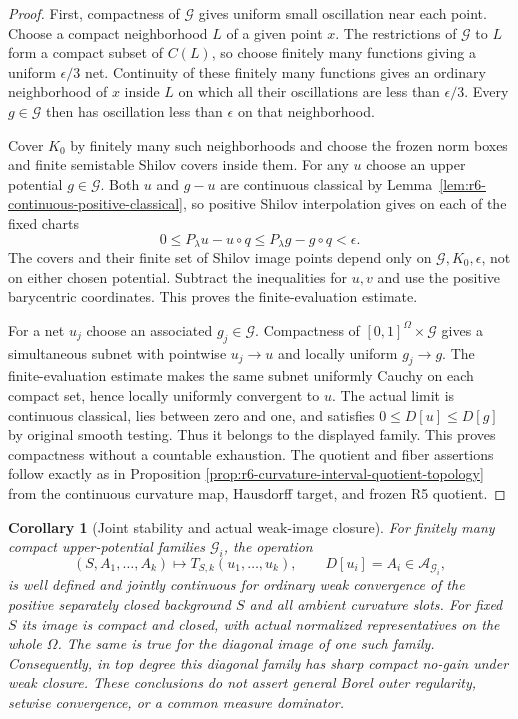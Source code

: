 \documentclass[11pt,a4paper]{article}
\numberwithin{equation}{section}
\newtheorem{corollary}[theorem]{Corollary}
\theoremstyle{definition}
\theoremstyle{remark}
\begin{document}
\begin{proof}
First, compactness of $\mathscr G$ gives uniform small oscillation
near each point. Choose a compact neighborhood $L$ of a given point
$x$. The restrictions of $\mathscr G$ to $L$ form a compact subset
of $C(L)$, so choose finitely many functions giving a uniform
$\epsilon/3$ net. Continuity of these finitely many functions gives
an ordinary neighborhood of $x$ inside $L$ on which all their
oscillations are less than $\epsilon/3$. Every $g\in\mathscr G$
then has oscillation less than $\epsilon$ on that neighborhood.

Cover $K_0$ by finitely many such neighborhoods and choose the
frozen norm boxes and finite semistable Shilov covers inside them.
For any $u$ choose an upper potential $g\in\mathscr G$. Both
$u$ and $g-u$ are continuous classical by
Lemma~\ref{lem:r6-continuous-positive-classical}, so positive
Shilov interpolation gives on each of the fixed charts
\[
                   0\le P_\lambda u-u\circ q
                         \le P_\lambda g-g\circ q<\epsilon.
\]
The covers and their finite set of Shilov image points depend only
on $\mathscr G,K_0,\epsilon$, not on either chosen potential.
Subtract the inequalities for $u,v$ and use the positive barycentric
coordinates. This proves the finite-evaluation estimate.

For a net $u_j$ choose an associated $g_j\in\mathscr G$. Compactness
of $[0,1]^\Omega\times\mathscr G$ gives a simultaneous subnet
with pointwise $u_j\to u$ and locally uniform $g_j\to g$.
The finite-evaluation estimate makes the same subnet uniformly Cauchy
on each compact set, hence locally uniformly convergent to $u$.
The actual limit is continuous classical, lies between zero and one,
and satisfies $0\le D[u]\le D[g]$ by original smooth testing.
Thus it belongs to the displayed family. This proves compactness
without a countable exhaustion. The quotient and fiber assertions
follow exactly as in Proposition
\ref{prop:r6-curvature-interval-quotient-topology} from the continuous
curvature map, Hausdorff target, and frozen R5 quotient.
\end{proof}

\begin{corollary}[Joint stability and actual weak-image closure]
\label{cor:r6-compact-upper-potential-stability}
For finitely many compact upper-potential families $\mathscr G_i$,
the operation
\[
 (S,A_1,\ldots,A_k)\longmapsto T_{S,k}(u_1,\ldots,u_k),
                  \qquad D[u_i]=A_i\in\mathscr A_{\mathscr G_i},
\]
is well defined and jointly continuous for ordinary weak convergence
of the positive separately closed background $S$ and all ambient
curvature slots. For fixed $S$ its image is compact and closed,
with actual normalized representatives on the whole $\Omega$.
The same is true for the diagonal image of one such family.
Consequently, in top degree this diagonal family has sharp compact
no-gain under weak closure. These conclusions do not assert general Borel outer
regularity, setwise convergence, or a common measure dominator.
\end{corollary}
\end{document}
